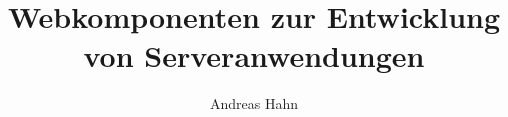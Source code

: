 \documentclass[bachelor,german]{hgbthesis}
\title{Webkomponenten zur Entwicklung von Serveranwendungen }
\author{Andreas Hahn}
\begin{document}

\frontmatter                    %

\maketitle
\tableofcontents

		
			

\mainmatter          %












\MakeBibliography                        %


\end{document}
